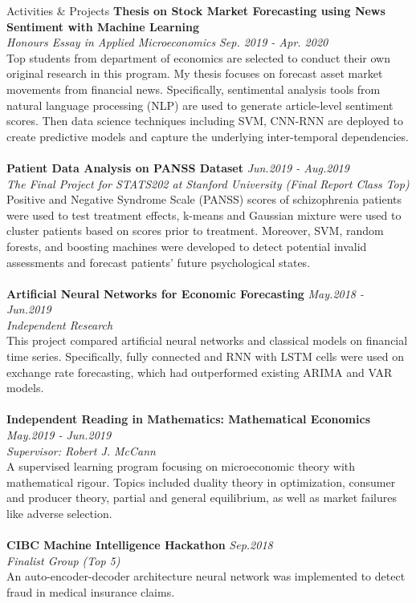 \documentclass{resume} %
\begin{document}
\begin{rSection}{Activities \& Projects}
{\bf Thesis on Stock Market Forecasting using News Sentiment with Machine Learning}
\\ \emph{Honours Essay in Applied Microeconomics} \hfill \emph{Sep. 2019 - Apr. 2020}
\\ Top students from department of economics are selected to conduct their own original research in this program. My thesis focuses on forecast asset market movements from financial news. Specifically, sentimental analysis tools from natural language processing (NLP) are used to generate article-level sentiment scores. Then data science techniques including SVM, CNN-RNN are deployed to create predictive models and capture the underlying inter-temporal dependencies.
\\
\\
{\bf Patient Data Analysis on PANSS Dataset} \hfill \emph{Jun.2019 - Aug.2019}
\\ \emph{The Final Project for STATS202 at Stanford University (Final Report Class Top)}
\\ Positive and Negative Syndrome Scale (PANSS) scores of schizophrenia patients were used to test treatment effects, k-means and Gaussian mixture were used to cluster patients based on scores prior to treatment. Moreover, SVM, random forests, and boosting machines were developed to detect potential invalid assessments and forecast patients' future psychological states.
\\
\\{\bf Artificial Neural Networks for Economic Forecasting} \hfill \emph{May.2018 - Jun.2019}
\\ \emph{Independent Research}
\\ This project compared artificial neural networks and classical models on financial time series. Specifically, fully connected and RNN with LSTM cells were used on exchange rate forecasting, which had outperformed existing ARIMA and VAR models.
\\
\\{\bf Independent Reading in Mathematics: Mathematical Economics} \hfill \emph{May.2019 - Jun.2019}
\\ \emph{Supervisor: Robert J. McCann}
\\
A supervised learning program focusing on microeconomic theory with mathematical rigour. Topics included duality theory in optimization, consumer and producer theory, partial and general equilibrium, as well as market failures like adverse selection.
\\
\\{\bf CIBC Machine Intelligence Hackathon} \hfill \emph{Sep.2018}
\\ \emph{Finalist Group (Top 5)}
\\
An auto-encoder-decoder architecture neural network was implemented to detect fraud in medical insurance claims.
\\

\end{rSection}
\end{document}
